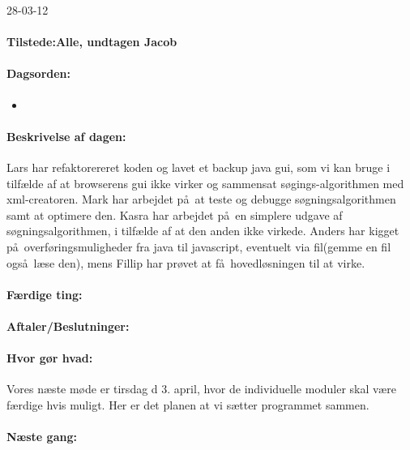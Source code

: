 \documentclass[a4paper,10pt,titlepage]{article}
\begin{document}
		\begin{center}
		28-03-12
		\end{center}
		
		\paragraph{Tilstede:Alle, undtagen Jacob}
		\paragraph{Dagsorden:}
		\begin{itemize}
					\item 
					
		\end{itemize}
		
		\paragraph{Beskrivelse af dagen:}
		Lars har refaktorereret koden og lavet et backup java gui, som vi kan bruge i tilf\ae lde af at browserens gui ikke virker og sammensat s\o gings-algorithmen med xml-creatoren.
Mark har arbejdet p\aa \ at teste og debugge s\o gningsalgorithmen samt at optimere den. Kasra har arbejdet p\aa \ en simplere udgave af s\o gningsalgorithmen, i tilf\ae lde af at den anden ikke virkede.
Anders har kigget p\aa \ overf\o ringsmuligheder fra java til javascript, eventuelt via fil(gemme en fil ogs\aa \ l\ae se den), mens Fillip har pr\o vet at f\aa \ hovedl\o sningen til at virke.

		\paragraph{F\ae rdige ting:}
		
		\paragraph{Aftaler/Beslutninger:}
		
		\paragraph{Hvor g\o r hvad:}
		Vores n\ae ste m\o de er tirsdag d 3. april, hvor de individuelle moduler skal v\ae re f\ae rdige hvis muligt. Her er det planen at vi s\ae tter programmet sammen.
		\paragraph{N\ae ste gang:}\mbox{}\\
		
\end{document}

